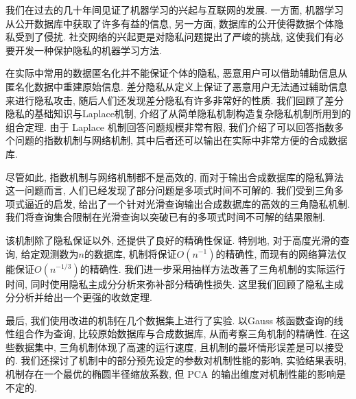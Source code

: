 \begin{cabstract}
  我们在过去的几十年间见证了机器学习的兴起与互联网的发展. 一方面, 机器学习从公开数据库中获取了许多有益的信息, 另一方面, 数据库的公开使得数据个体隐私受到了侵扰. 社交网络的兴起更是对隐私问题提出了严峻的挑战, 这使我们有必要开发一种保护隐私的机器学习方法. 
  
  在实际中常用的数据匿名化并不能保证个体的隐私, 恶意用户可以借助辅助信息从匿名化数据中重建原始信息. 差分隐私从定义上保证了恶意用户无法通过辅助信息来进行隐私攻击, 随后人们还发现差分隐私有许多非常好的性质. 我们回顾了差分隐私的基础知识与Laplace机制, 介绍了从简单隐私机制构造复杂隐私机制所用到的组合定理. 由于 Laplace 机制回答问题规模非常有限,  我们介绍了可以回答指数多个问题的指数机制与网络机制, 其中后者还可以输出在实际中非常方便的合成数据库. 
  
  尽管如此, 指数机制与网络机制都不是高效的, 而对于输出合成数据库的隐私算法这一问题而言, 人们已经发现了部分问题是多项式时间不可解的. 我们受到三角多项式逼近的启发, 给出了一个针对光滑查询输出合成数据库的高效的三角隐私机制. 我们将查询集合限制在光滑查询以突破已有的多项式时间不可解的结果限制.
  
  该机制除了隐私保证以外, 还提供了良好的精确性保证. 特别地, 对于高度光滑的查询, 给定观测数为$n$的数据库, 机制将保证$O\left(n^{-1}\right)$的精确性, 而现有的网络算法仅能保证$O\left(n^{-1/3}\right)$的精确性. 我们进一步采用抽样方法改善了三角机制的实际运行时间, 同时使用隐私主成分分析来弥补部分精确性损失. 这里我们回顾了隐私主成分分析并给出一个更强的收敛定理. 
  
  最后, 我们使用改进的机制在几个数据集上进行了实验. 以Gauss 核函数查询的线性组合作为查询, 比较原始数据库与合成数据库, 从而考察三角机制的精确性. 在这些数据集中, 三角机制体现了高速的运行速度, 且机制的最坏情形误差是可以接受的. 我们还探讨了机制中的部分预先设定的参数对机制性能的影响, 实验结果表明, 机制存在一个最优的椭圆半径缩放系数, 但 PCA 的输出维度对机制性能的影响是不定的. 
\end{cabstract}

